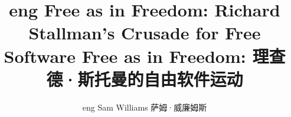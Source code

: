 \documentclass[UTF8, a4paper, 10pt]{book}
\def\eng{eng}
\begin{document}
\title{\ifdefined\eng
Free as in Freedom: Richard Stallman's Crusade for Free Software
\fi
\ifdefined\chs
Free as in Freedom: 理查德·斯托曼的自由软件运动
\fi
}
\author{\ifdefined\eng
Sam Williams
\fi
\ifdefined\chs
萨姆·威廉姆斯
\fi}
\date{}

\maketitle
\thispagestyle{empty}
\frontmatter
\thispagestyle{empty}
\tableofcontents


\mainmatter














\backmatter



\printindex
\end{document}
